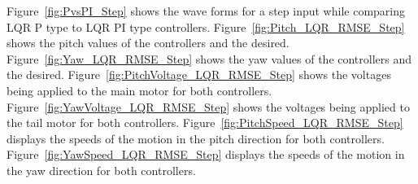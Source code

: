 Figure~\ref{fig:PvsPI_Step} shows the wave forms for a step input while comparing LQR P type to LQR PI type controllers.  Figure~\ref{fig:Pitch_LQR_RMSE_Step} shows the pitch values of the controllers and the desired.  Figure~\ref{fig:Yaw_LQR_RMSE_Step} shows the yaw values of the controllers and the desired.  Figure~\ref{fig:PitchVoltage_LQR_RMSE_Step} shows the voltages being applied to the main motor for both controllers.  Figure~\ref{fig:YawVoltage_LQR_RMSE_Step} shows the voltages being applied to the tail motor for both controllers.  Figure~\ref{fig:PitchSpeed_LQR_RMSE_Step} displays the speeds of the motion in the pitch direction for both controllers.  Figure~\ref{fig:YawSpeed_LQR_RMSE_Step} displays the speeds of the motion in the yaw direction for both controllers.
\begin{figure}[!htbp]
    \centering
\end{figure}
